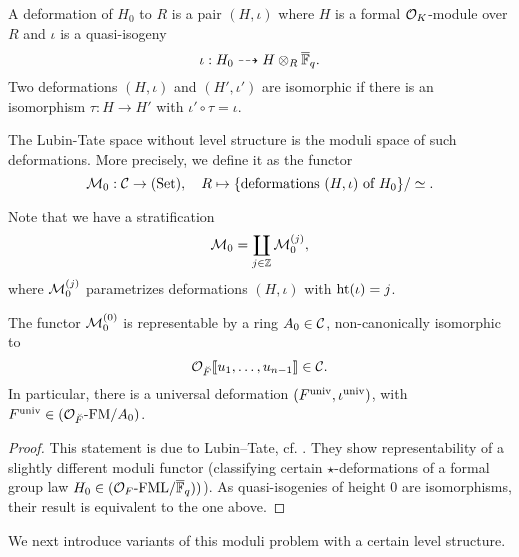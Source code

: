 \documentclass[../main.tex]{subfiles}
\begin{document}
\begin{defi}[Deformation]
  A deformation of $H_0$ to $R$ is a pair $(H, \iota)$ where
  $H$ is a formal $\mathcal{O}_K$-module over $R$ and $\iota$ is a quasi-isogeny
  \begin{equation*}
    \iota: H_0 \dashrightarrow H \otimes_R {\overline {\mathbb{F}}_q}.
  \end{equation*}
  Two deformations $(H, \iota)$ and $(H', \iota')$ are isomorphic if there is
  an isomorphism $\tau: H \to H'$ with $\iota' \circ \tau = \iota$. 
\end{defi}
The Lubin-Tate space without level structure is the moduli space of such deformations.
More precisely, we define it as the functor
\begin{equation*}
  \mathcal{M}_0: \mathcal{C} \to {(\mathrm{Set})}, \quad R \mapsto \{\text{deformations } (H, \iota) \text{
  of $H_0$}\}/\simeq.
\end{equation*}

Note that we have a stratification
\begin{equation*}
  \mathcal{M}_0 = \coprod_{j \in \mathbb{Z}} \mathcal{M}_0^{(j)},
\end{equation*}
where $\mathcal{M}_0^{(j)}$ parametrizes deformations $(H, \iota)$ with $\textnormal{ht}(\iota) = j$.

\begin{thm}[Representability of $\cM_0$]\label{thm:RepresentabilityOfDefSpaceWOLevel}
  The functor $\mathcal{M}_0^{(0)}$ is representable by a ring $A_0 \in \mathcal{C}$, non-canonically 
  isomorphic to
  \begin{equation*}
    \mathcal{O}_{\breve {F}}\llbracket u_1, \dots, u_{n-1} \rrbracket \in \mathcal{C}.
  \end{equation*}
In particular, there is a universal deformation
$(F^{\mathrm{univ}}, \iota^{\mathrm{univ}})$, with $F^{\mathrm{univ}} \in {({\mathcal{O}_{\breve {F}}}\text-\allowbreak\mathrm{FM}/{A_0})}$.
\begin{proof}
  This statement is due to Lubin--Tate, cf. \cite{LubinTate1966FormalModuli}. 
  They show representability of a slightly different moduli functor 
  (classifying certain $\star$-deformations of a formal group law $H_0 \in
  {({\mathcal{O}_F}\text-\allowbreak\mathrm{FML}/{\overline{\mathbb{F}}_q})})$). As quasi-isogenies of height $0$ are isomorphisms,
  their result is equivalent to the one above.
\end{proof}
\end{thm}

We next introduce variants of this moduli problem with a certain level structure.
\end{document}
